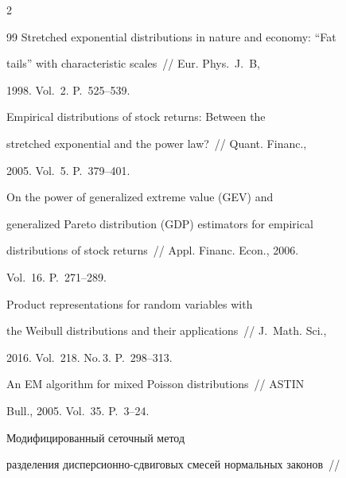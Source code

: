 \begin{multicols}{2}
{{\begin{thebibliography}{99}
    Stretched exponential distributions in nature and economy: ``Fat


    tails'' with characteristic scales~// Eur. Phys.~J.~B,


    1998. Vol.~2. P.~525--539.


    






    Empirical distributions of stock returns: Between the


    stretched exponential and the power law?~// Quant. Financ.,


    2005. Vol.~5. P.~379--401.


    






    On the power of generalized extreme value (GEV) and


    generalized Pareto distribution (GDP) estimators for empirical


    distributions of stock returns~// Appl. Financ. Econ., 2006.


    Vol.~16. P.~271--289.


    




 Product representations for random variables with


    the Weibull distributions and their applications~// J.~Math. Sci., 


    2016. Vol.~218. No.\,3. P.~298--313.


    




 An EM algorithm for mixed Poisson distributions~// ASTIN


    Bull., 2005. Vol.~35. P.~3--24.


    




     Модифицированный сеточный метод


    разделения дис\-пер\-си\-он\-но-сдви\-го\-вых смесей нормальных законов~//



\end{thebibliography}}}
\end{multicols}
